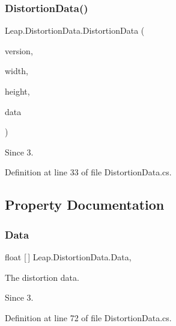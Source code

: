 \subsubsection{\texorpdfstring{DistortionData()}{DistortionData()}\hspace{0.1cm}{\footnotesize\ttfamily [2/2]}}
{\footnotesize\ttfamily Leap.\+Distortion\+Data.\+Distortion\+Data (\begin{DoxyParamCaption}\item[{U\+Int64}]{version,  }\item[{float}]{width,  }\item[{float}]{height,  }\item[{float \mbox{[}$\,$\mbox{]}}]{data }\end{DoxyParamCaption})}





\begin{DoxySince}{Since}
3. 
\end{DoxySince}


Definition at line 33 of file Distortion\+Data.\+cs.



\subsection{Property Documentation}
\mbox{\label{class_leap_1_1_distortion_data_a104930e4a0b916ff12a05dd09eb88853}} 
\subsubsection{\texorpdfstring{Data}{Data}}
{\footnotesize\ttfamily float \mbox{[}$\,$\mbox{]} Leap.\+Distortion\+Data.\+Data\hspace{0.3cm}{\ttfamily [get]}, {\ttfamily [set]}}



The distortion data. 

\begin{DoxySince}{Since}
3. 
\end{DoxySince}


Definition at line 72 of file Distortion\+Data.\+cs.

\mbox{\label{class_leap_1_1_distortion_data_aa8df661c71691b85d7197a2c9e13792c}} 
